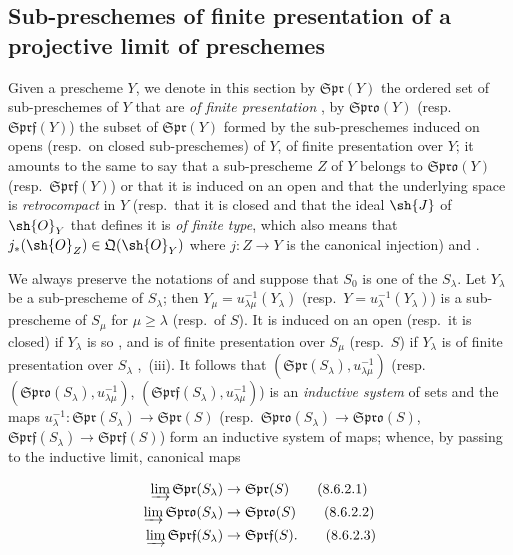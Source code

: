 \subsection{Sub-preschemes of finite presentation of a projective limit of preschemes}
\label{subsection:IV.8.6}

\begin{env}[8.6.1]
\label{IV.8.6.1}
Given a prescheme $Y$, we denote in this section by $\mathfrak{Spr}(Y)$ the ordered set
 of sub-preschemes of $Y$ that are \emph{of finite presentation}
, by $\mathfrak{Spro}(Y)$ (resp.\ $\mathfrak{Sprf}(Y)$) the subset of $\mathfrak{Spr}(Y)$ formed by the sub-preschemes induced on opens (resp.\ on closed sub-preschemes) of $Y$, of finite presentation over $Y$; it amounts to the same to say that a sub-prescheme $Z$ of $Y$ belongs to $\mathfrak{Spro}(Y)$ (resp.\ $\mathfrak{Sprf}(Y)$) or that it is induced on an open and that the underlying space is \emph{retrocompact} in $Y$ (resp.\ that it is closed and that the ideal $\sh{J}$ of $\sh{O}_Y$ that defines it is \emph{of finite type}, which also means that $j_*(\sh{O}_Z)\in\mathfrak{Q}(\sh{O}_Y)$ where $j:Z\to Y$ is the canonical injection)  and .
\end{env}

\begin{env}[8.6.2]
\label{IV.8.6.2}
We always preserve the notations of  and suppose that $S_0$ is one of the $S_\lambda$.
Let $Y_\lambda$ be a sub-prescheme of $S_\lambda$; then $Y_\mu=u_{\lambda\mu}^{-1}(Y_\lambda)$ (resp.\ $Y=u_\lambda^{-1}(Y_\lambda)$) is a sub-prescheme of $S_\mu$ for $\mu\geqslant\lambda$ (resp.\ of $S$). It is induced on an open (resp.\ it is closed) if $Y_\lambda$ is so , and is of finite presentation over $S_\mu$ (resp.\ $S$) if $Y_\lambda$ is of finite presentation over $S_\lambda$ ,~(iii). It follows that $(\mathfrak{Spr}(S_\lambda),u_{\lambda\mu}^{-1})$ (resp.\ $(\mathfrak{Spro}(S_\lambda),u_{\lambda\mu}^{-1})$, $(\mathfrak{Sprf}(S_\lambda),u_{\lambda\mu}^{-1})$) is an \emph{inductive system} of sets and the maps $u_\lambda^{-1}:\mathfrak{Spr}(S_\lambda)\to\mathfrak{Spr}(S)$ (resp.\ $\mathfrak{Spro}(S_\lambda)\to\mathfrak{Spro}(S)$, $\mathfrak{Sprf}(S_\lambda)\to\mathfrak{Sprf}(S)$) form an inductive system of maps; whence, by passing to the inductive limit, canonical maps
\end{env}

\begin{align}
  \varinjlim \mathfrak{Spr}(S_\lambda) &\to \mathfrak{Spr}(S) \tag{8.6.2.1}\label{IV.8.6.2.1}\\
  \varinjlim \mathfrak{Spro}(S_\lambda) &\to \mathfrak{Spro}(S) \tag{8.6.2.2}\label{IV.8.6.2.2}\\
  \varinjlim \mathfrak{Sprf}(S_\lambda) &\to \mathfrak{Sprf}(S). \tag{8.6.2.3}\label{IV.8.6.2.3}
\end{align}

